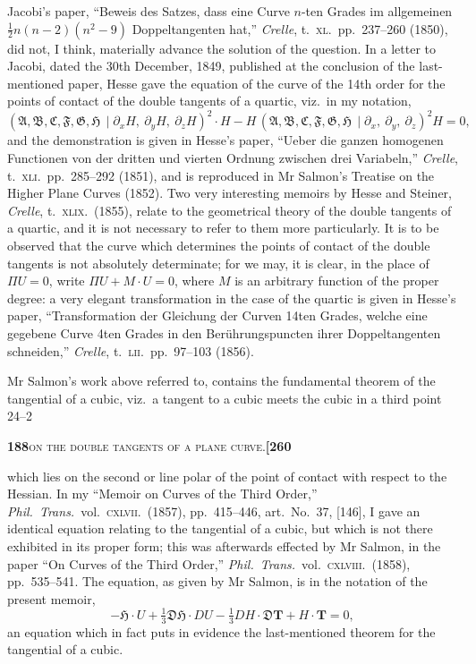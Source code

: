 \documentclass[11pt]{article}
\newcommand{\Cdel}{\mid}
\begin{document}
Jacobi's paper, ``Beweis des Satzes, dass eine Curve $n$-ten Grades im allgemeinen $\tfrac{1}{2}n(n-2)(n^2-9)$ Doppeltangenten hat,'' \textit{Crelle}, t.~\textsc{xl}.~pp.~237--260 (1850), did not, I think, materially advance the solution of the question. In a letter to Jacobi, dated the 30th December, 1849, published at the conclusion of the last-mentioned paper, Hesse gave the equation of the curve of the 14th order for the points of contact of the double tangents of a quartic, viz.\ in my notation,
\[
(\mathfrak{A}, \mathfrak{B}, \mathfrak{C}, \mathfrak{F}, \mathfrak{G}, \mathfrak{H}\,\Cdel\partial_x H,\ \partial_y H,\ \partial_z H)^2 \cdot H - H\,(\mathfrak{A}, \mathfrak{B}, \mathfrak{C}, \mathfrak{F}, \mathfrak{G}, \mathfrak{H}\,\Cdel\partial_x,\ \partial_y,\ \partial_z)^2 H = 0,
\]
and the demonstration is given in Hesse's paper, ``Ueber die ganzen homogenen Functionen von der dritten und vierten Ordnung zwischen drei Variabeln,'' \textit{Crelle}, t.~\textsc{xli}.~pp.~285--292 (1851), and is reproduced in Mr Salmon's Treatise on the Higher Plane Curves (1852). Two very interesting memoirs by Hesse and Steiner, \textit{Crelle}, t.~\textsc{xlix}.~(1855), relate to the geometrical theory of the double tangents of a quartic, and it is not necessary to refer to them more particularly. It is to be observed that the curve which determines the points of contact of the double tangents is not absolutely determinate; for we may, it is clear, in the place of $\Pi U = 0$, write $\Pi U + M \cdot U = 0$, where $M$ is an arbitrary function of the proper degree: a very elegant transformation in the case of the quartic is given in Hesse's paper, ``Transformation der Gleichung der Curven 14ten Grades, welche eine gegebene Curve 4ten Grades in den Ber\"uhrungspuncten ihrer Doppeltangenten schneiden,'' \textit{Crelle}, t.~\textsc{lii}.~pp.~97--103 (1856).

Mr Salmon's work above referred to, contains the fundamental theorem of the tangential of a cubic, viz.\ a tangent to a cubic meets the cubic in a third point
\hfill 24--2

\newpage

\noindent\textbf{188}\hfill\textsc{on the double tangents of a plane curve.}\hfill\textbf{[260}

\medskip

\noindent which lies on the second or line polar of the point of contact with respect to the Hessian. In my ``Memoir on Curves of the Third Order,'' \textit{Phil.~Trans.}~vol.~\textsc{cxlvii}.~(1857), pp.~415--446, art.~No.~37, [146], I gave an identical equation relating to the tangential of a cubic, but which is not there exhibited in its proper form; this was afterwards effected by Mr Salmon, in the paper ``On Curves of the Third Order,'' \textit{Phil.~Trans.}~vol.~\textsc{cxlviii}.~(1858), pp.~535--541. The equation, as given by Mr Salmon, is in the notation of the present memoir,
\[
-\mathfrak{H} \cdot U + \tfrac{1}{3}\mathfrak{D}\mathfrak{H} \cdot DU - \tfrac{1}{3}DH \cdot \mathfrak{D}\mathbf{T} + H \cdot \mathbf{T} = 0,
\]
an equation which in fact puts in evidence the last-mentioned theorem for the tangential of a cubic.
\end{document}
